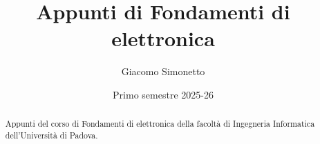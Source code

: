 \documentclass[a4paper]{article}
\title{Appunti di Fondamenti di elettronica}
\author{Giacomo Simonetto}
\date{Primo semestre 2025-26}
\begin{document}
\maketitle
\begin{abstract}
	Appunti del corso di Fondamenti di elettronica della facoltà di Ingegneria Informatica dell'Università di Padova.
\end{abstract}

\newpage

\tableofcontents

\newpage





\end{document}
